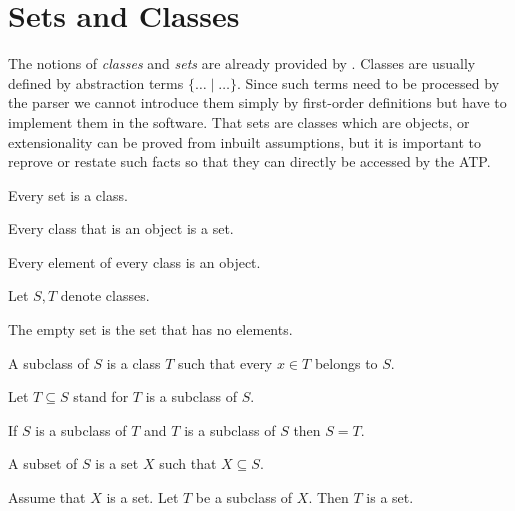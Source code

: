 \documentclass[11pt]{article}
\begin{document}
\section{Sets and Classes}
The notions of \textit{classes} and \textit{sets} are already
provided by \Naproche. Classes are usually defined by
abstraction terms $\{\dots\mid\dots\}$. Since such terms need to be
processed by the parser we cannot introduce them simply by first-order
definitions but have to implement them in the software.
That sets are classes which are objects, or extensionality can be proved
from inbuilt assumptions, but it is important to reprove or restate such
facts so that they can directly be accessed by the ATP.

\begin{forthel}

\begin{lemma} Every set is a class. \end{lemma}

\begin{lemma} Every class that is an object is a set. \end{lemma}

\begin{axiom} Every element of every class is an object.
\end{axiom}

Let $S,T$ denote classes.

\begin{definition} The empty set is the set that has
no elements.
\end{definition}

\begin{definition}
A subclass of $S$ is a class $T$ such that every $x \in T$
belongs to $S$.
\end{definition}

Let $T \subseteq S$ stand for $T$ is a subclass of $S$.

\begin{lemma}  If $S$ is a subclass of $T$ and
$T$ is a subclass of $S$ then $S = T$.
\end{lemma}

\begin{definition}
A subset of $S$ is a set $X$ such that $X \subseteq S$.
\end{definition}

\begin{axiom}  Assume that $X$ is a set.
Let $T$ be a subclass of $X$. Then $T$ is a set.
\end{axiom}

\end{forthel}
\end{document}
